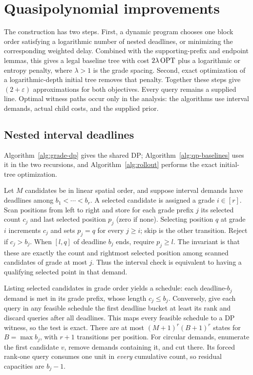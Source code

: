\section{Quasipolynomial improvements}
\label{sec:quasipolynomial}

The construction has two steps. First, a dynamic program chooses one
block order satisfying a logarithmic number of nested deadlines, or
minimizing the corresponding weighted delay. Combined with the
supporting-prefix and endpoint lemmas, this gives a legal baseline tree
with cost $2\lambda\operatorname{OPT}$ plus a logarithmic or entropy penalty, where
$\lambda>1$ is the grade spacing. Second, exact optimization of a
logarithmic-depth initial tree removes that penalty. Together these
steps give $(2+\varepsilon)$ approximations for both objectives.
Every query remains a supplied line. Optimal witness paths occur only
in the analysis: the algorithms use interval demands, actual child
costs, and the supplied prior.

\subsection{Nested interval deadlines}

Algorithm~\ref{alg:grade-dp} gives the shared DP; Algorithm~\ref{alg:qp-baselines}
uses it in the two recursions, and Algorithm~\ref{alg:rollout} performs
the exact initial-tree optimization.

Let $M$ candidates be in linear spatial order, and suppose interval
demands have deadlines among $b_1<\cdots<b_r$. A selected candidate is
assigned a grade $i\in[r]$. Scan positions from left to right and store
for each grade prefix $j$ its selected count $c_j$ and last selected
position $p_j$ (zero if none). Selecting position $q$ at grade $i$
increments $c_j$ and sets $p_j=q$ for every $j\ge i$; skip is the
other transition. Reject if $c_j>b_j$. When $[l,q]$ of deadline
$b_j$ ends, require $p_j\ge l$. The invariant is that these are
exactly the count and rightmost selected position among scanned
candidates of grade at most $j$. Thus the interval check is equivalent
to having a qualifying selected point in that demand.

Listing selected candidates in grade order yields a schedule: each
deadline-$b_j$ demand is met in its grade prefix, whose length
$c_j\le b_j$. Conversely, give each query in any feasible schedule
the first deadline bucket at least its rank and discard queries after
all deadlines. This maps every feasible schedule to a DP witness, so
the test is exact. There are at most $(M+1)^r(B+1)^r$ states for
$B=\max b_j$, with $r+1$ transitions per position. For circular
demands, enumerate the first candidate $v$, remove demands containing
it, and cut there. Its forced rank-one query consumes one unit in
\emph{every} cumulative count, so residual capacities are $b_j-1$.


